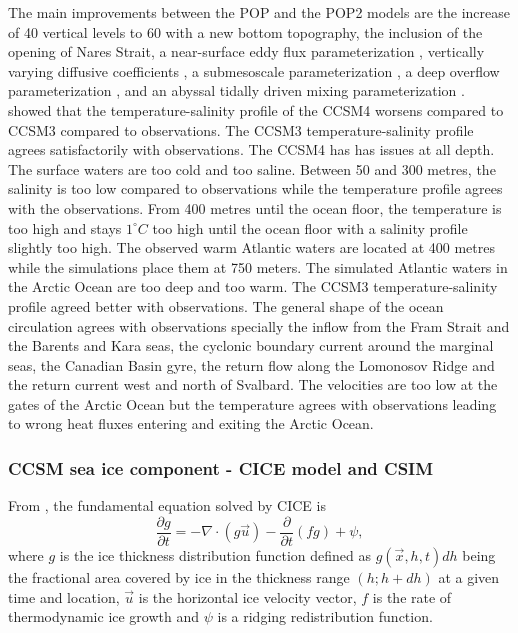 The main improvements between the POP and the POP2 models are the increase of 40 vertical levels to 60 with a new bottom topography, the inclusion of the opening of Nares Strait, a near-surface eddy flux parameterization \citep{2008ferrari}, vertically varying diffusive coefficients \citep{2006ferreira}, a submesoscale parameterization \citep{2008fka,2008fkb,2011fk}, a deep overflow parameterization \citep{briegleb2010}, and an abyssal tidally driven mixing parameterization \citep{2009jayne}. \citet{2012jahn} showed that the temperature-salinity profile of the CCSM4 worsens compared to CCSM3 compared to observations. The CCSM3 temperature-salinity profile agrees satisfactorily with observations. The CCSM4 has has issues at all depth. The surface waters are too cold and too saline. Between 50 and 300 metres, the salinity is too low compared to observations while the temperature profile agrees with the observations. From 400 metres until the ocean floor, the temperature is too high and stays $1^\circ C$ too high until the ocean floor with a salinity profile slightly too high. The observed warm Atlantic waters are located at 400 metres while the simulations place them at 750 meters. The simulated Atlantic waters in the Arctic Ocean are too deep and too warm. The CCSM3 temperature-salinity profile agreed better with observations. The general shape of the ocean circulation agrees with observations specially the inflow from the Fram Strait and the Barents and Kara seas, the cyclonic boundary current around the marginal seas, the Canadian Basin gyre, the return flow along the Lomonosov Ridge and the return current west and north of Svalbard. The velocities are too low at the gates of the Arctic Ocean but the temperature agrees with observations leading to wrong heat fluxes entering and exiting the Arctic Ocean. 

\subsubsection{CCSM sea ice component - CICE model and CSIM}\label{siCCSM}


From \citet{Hunke:2008ly}, the fundamental equation solved by CICE is \citep{Thorndike:1975fk}
\begin{equation}\label{ciceeq}
\frac{\partial g}{\partial t} = -\nabla \cdot (g\vec{u})-\frac{\partial}{\partial t}(fg)+\psi,
\end{equation}
where $g$ is the ice thickness distribution function defined as $g(\vec{x},h,t) dh$ being the fractional area covered by ice in the thickness range $(h; h + dh)$ at a given time and location, $\vec{u}$ is the horizontal ice velocity vector, $f$ is the rate of thermodynamic ice growth and $\psi$ is a ridging redistribution function. 

